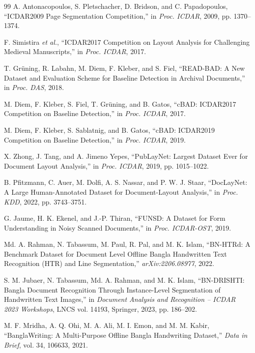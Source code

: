\documentclass[11pt]{article}
\begin{document}
\begin{thebibliography}{99}
 A. Antonacopoulos, S. Pletschacher, D. Bridson, and C. Papadopoulos, ``ICDAR2009 Page Segmentation Competition,'' in \emph{Proc. ICDAR}, 2009, pp. 1370--1374.

 F. Simistira \emph{et al.}, ``ICDAR2017 Competition on Layout Analysis for Challenging Medieval Manuscripts,'' in \emph{Proc. ICDAR}, 2017.

 T. Gr\"uning, R. Labahn, M. Diem, F. Kleber, and S. Fiel, ``READ-BAD: A New Dataset and Evaluation Scheme for Baseline Detection in Archival Documents,'' in \emph{Proc. DAS}, 2018.

 M. Diem, F. Kleber, S. Fiel, T. Gr\"uning, and B. Gatos, ``cBAD: ICDAR2017 Competition on Baseline Detection,'' in \emph{Proc. ICDAR}, 2017.

 M. Diem, F. Kleber, S. Sablatnig, and B. Gatos, ``cBAD: ICDAR2019 Competition on Baseline Detection,'' in \emph{Proc. ICDAR}, 2019.

 X. Zhong, J. Tang, and A. Jimeno Yepes, ``PubLayNet: Largest Dataset Ever for Document Layout Analysis,'' in \emph{Proc. ICDAR}, 2019, pp. 1015--1022.

 B. Pfitzmann, C. Auer, M. Dolfi, A. S. Nassar, and P. W. J. Staar, ``DocLayNet: A Large Human-Annotated Dataset for Document-Layout Analysis,'' in \emph{Proc. KDD}, 2022, pp. 3743--3751.

 G. Jaume, H. K. Ekenel, and J.-P. Thiran, ``FUNSD: A Dataset for Form Understanding in Noisy Scanned Documents,'' in \emph{Proc. ICDAR-OST}, 2019.

 Md. A. Rahman, N. Tabassum, M. Paul, R. Pal, and M. K. Islam, ``BN-HTRd: A Benchmark Dataset for Document Level Offline Bangla Handwritten Text Recognition (HTR) and Line Segmentation,'' \emph{arXiv:2206.08977}, 2022.

 S. M. Jubaer, N. Tabassum, Md. A. Rahman, and M. K. Islam, ``BN-DRISHTI: Bangla Document Recognition Through Instance-Level Segmentation of Handwritten Text Images,'' in \emph{Document Analysis and Recognition -- ICDAR 2023 Workshops}, LNCS vol. 14193, Springer, 2023, pp. 186--202.

 M. F. Mridha, A. Q. Ohi, M. A. Ali, M. I. Emon, and M. M. Kabir, ``BanglaWriting: A Multi-Purpose Offline Bangla Handwriting Dataset,'' \emph{Data in Brief}, vol. 34, 106633, 2021.


\end{thebibliography}
\end{document}
